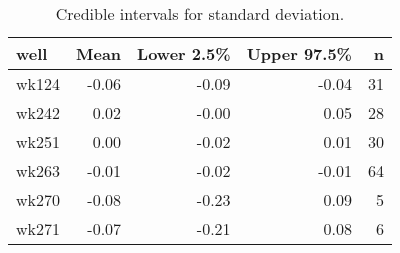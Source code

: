 \begin{table}[ht]
\centering
\begin{tabular}{lrrrr}
  \hline
well & Mean & Lower 2.5\% & Upper 97.5\% & n \\ 
  \hline
wk124 & -0.06 & -0.09 & -0.04 &  31 \\ 
  wk242 & 0.02 & -0.00 & 0.05 &  28 \\ 
  wk251 & 0.00 & -0.02 & 0.01 &  30 \\ 
  wk263 & -0.01 & -0.02 & -0.01 &  64 \\ 
  wk270 & -0.08 & -0.23 & 0.09 &   5 \\ 
  wk271 & -0.07 & -0.21 & 0.08 &   6 \\ 
   \hline
\end{tabular}
\caption{Credible intervals for standard deviation.} 
\label{tab:sd}
\end{table}
